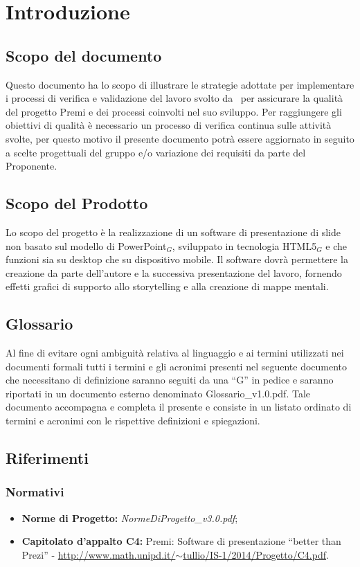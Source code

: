 \section{Introduzione}

\subsection{Scopo del documento}
Questo documento ha lo scopo di illustrare le strategie adottate per implementare i processi di verifica e validazione del lavoro svolto da \gruppo\ per assicurare la qualità del progetto Premi e dei processi coinvolti nel suo sviluppo. Per raggiungere gli obiettivi di qualità è necessario un processo di verifica continua sulle attività svolte, per questo motivo il presente documento potrà essere aggiornato in seguito a scelte progettuali del gruppo e/o variazione dei requisiti da parte del Proponente.

\subsection{Scopo del Prodotto}
Lo scopo del progetto è la realizzazione di un software di presentazione di slide non basato sul modello di PowerPoint$_{G}$, sviluppato in tecnologia HTML5$_{G}$ e che funzioni sia su desktop che su dispositivo mobile. Il software dovrà permettere la creazione da parte dell'autore e la successiva presentazione del lavoro, fornendo effetti grafici di supporto allo storytelling e alla creazione di mappe mentali.

\subsection{Glossario}
Al fine di evitare ogni ambiguità relativa al linguaggio e ai termini utilizzati nei documenti formali tutti i termini e gli acronimi presenti nel seguente documento che necessitano di definizione saranno seguiti da una ``G'' in pedice e saranno riportati in un documento esterno denominato Glossario\_v1.0.pdf. Tale documento accompagna e completa il presente e consiste in un listato ordinato di termini e acronimi con le rispettive definizioni e spiegazioni.

\subsection{Riferimenti}
\subsubsection{Normativi}
\begin{itemize}
	\item \textbf{Norme di Progetto:} \textit{NormeDiProgetto\_v3.0.pdf};
	\item \textbf{Capitolato d'appalto C4:} Premi: Software di presentazione ``better than Prezi'' - \href{http://www.math.unipd.it/~tullio/IS-1/2014/Progetto/C4.pdf}{http://www.math.unipd.it/$\sim$tullio/IS-1/2014/Progetto/C4.pdf}.
\end{itemize}
